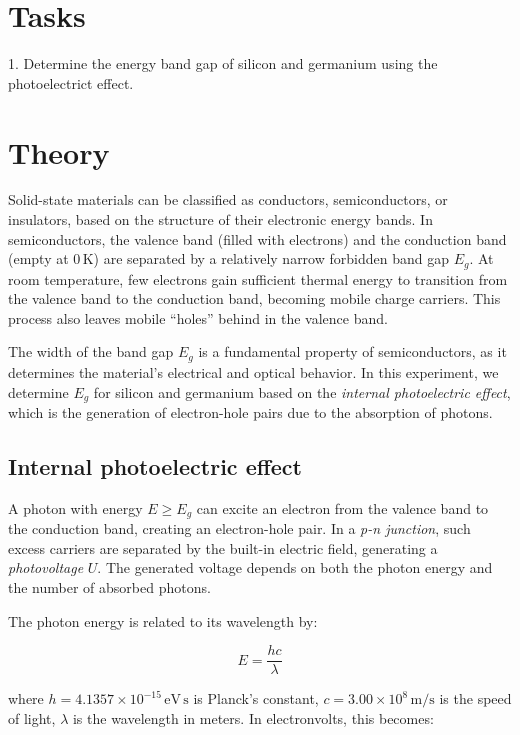 \documentclass[english,11pt,a4paper]{article}
\begin{document}
	\begin{multicols}{2}
		\section{Tasks}
	
	1. Determine the energy band gap of silicon and germanium using the photoelectrict effect.

		\section{Theory}
		
		Solid-state materials can be classified as conductors, semiconductors, or insulators, based on the structure of their electronic energy bands. In semiconductors, the valence band (filled with electrons) and the conduction band (empty at $0\,\mathrm{K}$) are separated by a relatively narrow forbidden band gap $E_g$. At room temperature, few electrons gain sufficient thermal energy to transition from the valence band to the conduction band, becoming mobile charge carriers. This process also leaves mobile “holes” behind in the valence band.
		
		The width of the band gap $E_g$ is a fundamental property of semiconductors, as it determines the material's electrical and optical behavior. In this experiment, we determine $E_g$ for silicon and germanium based on the \emph{internal photoelectric effect}, which is the generation of electron-hole pairs due to the absorption of photons.
		
		\subsection{Internal photoelectric effect}
		
		A photon with energy $E \geq E_g$ can excite an electron from the valence band to the conduction band, creating an electron-hole pair. In a \textit{p-n junction}, such excess carriers are separated by the built-in electric field, generating a \emph{photovoltage} $U$. The generated voltage depends on both the photon energy and the number of absorbed photons.
		
		The photon energy is related to its wavelength by:
		
	
		\begin{equation}
			E = \frac{hc}{\lambda}
		\end{equation}
	
		
		where  
		$h = 4.1357 \times 10^{-15} \, \mathrm{eV\,s}$ is Planck's constant,  
		$c = 3.00 \times 10^8 \, \mathrm{m/s}$ is the speed of light,  
		$\lambda$ is the wavelength in meters.  
		In electronvolts, this becomes:
		

\end{multicols}
\end{document}
